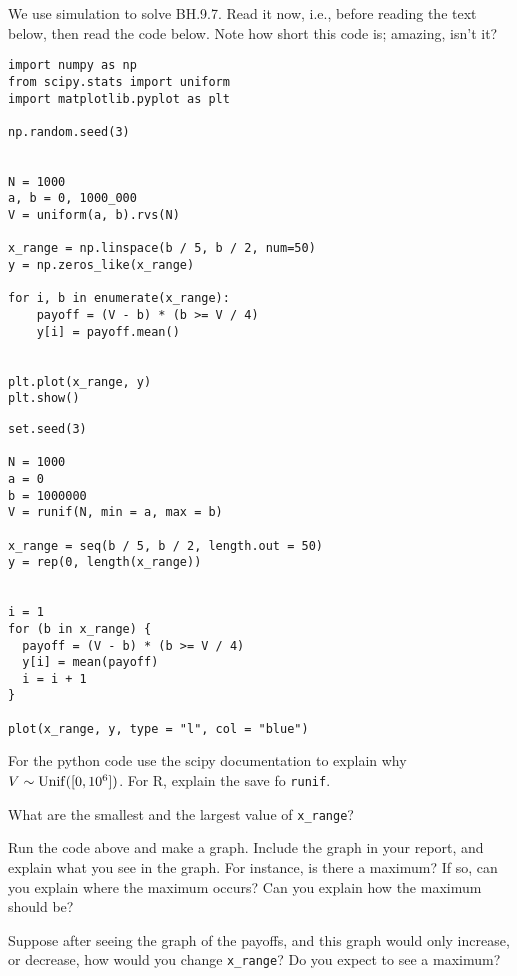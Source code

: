 We use  simulation to solve  BH.9.7.
Read it now, i.e., before reading the text below, then read the code below.
Note how short  this code is;  amazing, isn't it?



\begin{verbatim}
import numpy as np
from scipy.stats import uniform
import matplotlib.pyplot as plt

np.random.seed(3)


N = 1000
a, b = 0, 1000_000
V = uniform(a, b).rvs(N)

x_range = np.linspace(b / 5, b / 2, num=50)
y = np.zeros_like(x_range)

for i, b in enumerate(x_range):
    payoff = (V - b) * (b >= V / 4)
    y[i] = payoff.mean()


plt.plot(x_range, y)
plt.show()
\end{verbatim}

\begin{verbatim}
set.seed(3)

N = 1000
a = 0
b = 1000000
V = runif(N, min = a, max = b)

x_range = seq(b / 5, b / 2, length.out = 50)
y = rep(0, length(x_range))


i = 1
for (b in x_range) {
  payoff = (V - b) * (b >= V / 4)
  y[i] = mean(payoff)
  i = i + 1
}

plot(x_range, y, type = "l", col = "blue")
\end{verbatim}


\begin{exercise}
For the python code use the scipy documentation to explain why $V\sim\mathrm{Unif}([0,10^{6}])$. For R, explain the save fo \texttt{runif}.
\end{exercise}



\begin{exercise}
What are the smallest and the largest value of \verb|x_range|?
\end{exercise}

\begin{exercise}
Run the code above and make a graph. Include the graph in your report, and explain what you see in the graph. For instance, is there a maximum? If so, can you explain where the maximum occurs? Can you explain how the maximum should be?
\end{exercise}


\begin{exercise}
Suppose after seeing the graph of the payoffs, and this graph would only increase, or decrease, how would you change \verb|x_range|? Do you expect to see a maximum?
\end{exercise}




